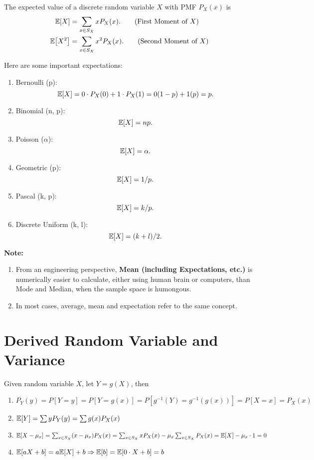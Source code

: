 \begin{definition}
    The expected value of a discrete random variable $X$ with \textnormal{PMF} $P_X(x)$ is
    \begin{align}
        \E{X}&=\sum_{x\in S_X}xP_X(x). \tag{First Moment of $X$}\\
        \E{X^2}&=\sum_{x\in S_X}x^2P_X(x). \tag{Second Moment of $X$}
    \end{align}
\end{definition}

\begin{theorem}
    Here are some important expectations:
    \begin{enumerate}
        \item Bernoulli (p): \[\E{X}=0\cdot P_X(0)+1\cdot P_X(1)=0(1-p)+1(p)=p.\]
        \item Binomial (n, p): \[\E{X}=np.\]
        \item Poisson ($\alpha$): \[\E{X}=\alpha.\]
        \item Geometric (p): \[\E{X}=1/p.\]
        \item Pascal (k, p): \[\E{X}=k/p.\]
        \item Discrete Uniform (k, l): \[\E{X}=(k+l)/2.\]
    \end{enumerate}
\end{theorem}

\textbf{Note:}{
    \begin{enumerate}
        \item From an engineering perspective, \textbf{Mean (including Expectations, etc.)} is numerically easier to calculate, either using human brain or computers, than Mode and Median, when the sample space is humongous.
        \item In most cases, average, mean and expectation refer to the same concept.
    \end{enumerate}
}

\section{Derived Random Variable and Variance}
\begin{theorem}
    Given random variable $X$, let $Y = g(X)$, then
    \begin{enumerate}
        \item $P_Y(y) = P[Y=y] = P[Y=g(x)] = P[g^{-1}(Y)=g^{-1}(g(x))] = P[X=x] = P_X(x)$
        \item $\E{Y} = \sum yP_Y(y) = \sum g(x)P_X(x)$
        \item $\E{X-\mu_x}=\sum_{x\in S_X}(x-\mu_x)P_X(x)=\sum_{x\in S_X}xP_X(x)-\mu_x\sum_{x\in S_X}P_X(x)=\E{X}-\mu_x\cdot 1=0$
        \item $\E{aX+b}=a\E{X}+b \Rightarrow \E{b}=\E{0\cdot X+b}=b$
    \end{enumerate}
\end{theorem}

